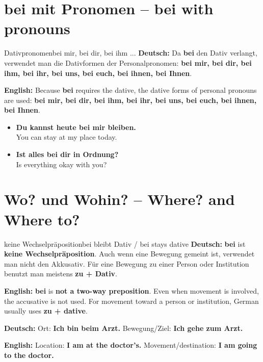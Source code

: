\documentclass[a4paper,11pt]{article}
\newcommand{\GermanText}[1]{\textbf{Deutsch: }#1\par}
\newcommand{\EnglishText}[1]{{\small\color{SoftGray}\textbf{English: }#1\par}}
\newcommand{\ExampleItem}[2]{\item \textbf{#1}\\{\small\color{SoftGray}#2}}
\begin{document}
\section{bei mit Pronomen -- bei with pronouns}
\begin{grammarentry}{Dativpronomen}{bei mir, bei dir, bei ihm ...}
\GermanText{Da \textbf{bei} den Dativ verlangt, verwendet man die Dativformen der Personalpronomen: \textbf{bei mir, bei dir, bei ihm, bei ihr, bei uns, bei euch, bei ihnen, bei Ihnen}.}
\EnglishText{Because \textbf{bei} requires the dative, the dative forms of personal pronouns are used: \textbf{bei mir, bei dir, bei ihm, bei ihr, bei uns, bei euch, bei ihnen, bei Ihnen}.}
\end{grammarentry}
\begin{exbox}\begin{itemize}
\ExampleItem{Du kannst heute bei mir bleiben.}{You can stay at my place today.}
\ExampleItem{Ist alles bei dir in Ordnung?}{Is everything okay with you?}
\end{itemize}\end{exbox}

\section{Wo? und Wohin? -- Where? and Where to?}
\begin{grammarentry}{keine Wechselpräposition}{bei bleibt Dativ / bei stays dative}
\GermanText{\textbf{bei} ist \textbf{keine Wechselpräposition}. Auch wenn eine Bewegung gemeint ist, verwendet man nicht den Akkusativ. Für eine Bewegung zu einer Person oder Institution benutzt man meistens \textbf{zu + Dativ}.}
\EnglishText{\textbf{bei} is \textbf{not a two-way preposition}. Even when movement is involved, the accusative is not used. For movement toward a person or institution, German usually uses \textbf{zu + dative}.}
\GermanText{Ort: \textbf{Ich bin beim Arzt.} Bewegung/Ziel: \textbf{Ich gehe zum Arzt.}}
\EnglishText{Location: \textbf{I am at the doctor's.} Movement/destination: \textbf{I am going to the doctor.}}
\end{grammarentry}
\end{document}
